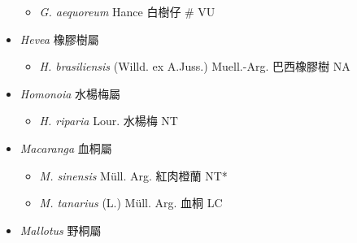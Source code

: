 \begin{itemize}
  \begin{itemize}
        \item[] \textit{G. aequoreum} Hance  白樹仔  \# VU
  \end{itemize}
 \item[] \textit{Hevea} 橡膠樹屬
                                
  \begin{itemize}
        \item[] \textit{H. brasiliensis} (Willd. ex A.Juss.) Muell.-Arg.  巴西橡膠樹   NA
  \end{itemize}
 \item[] \textit{Homonoia} 水楊梅屬
                                
  \begin{itemize}
        \item[] \textit{H. riparia} Lour.  水楊梅   NT
  \end{itemize}
 \item[] \textit{Macaranga} 血桐屬
                                
  \begin{itemize}
        \item[] \textit{M. sinensis} Müll. Arg.  紅肉橙蘭   NT*
        \item[] \textit{M. tanarius} (L.) Müll. Arg.  血桐   LC
  \end{itemize}
 \item[] \textit{Mallotus} 野桐屬
                                

\end{itemize}
